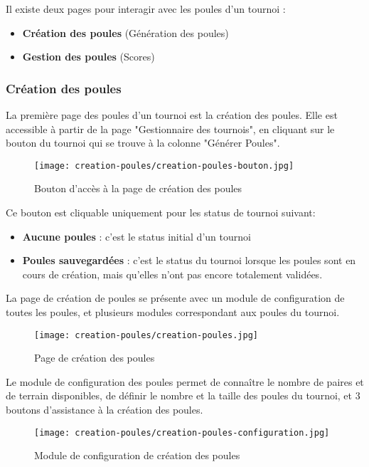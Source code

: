 Il existe deux pages pour interagir avec les poules d'un tournoi :

\begin{itemize}
\item \textbf{Création des poules} (Génération des poules)
\item \textbf{Gestion des poules} (Scores)
\end{itemize}

\subsubsection{Création des poules}

La première page des poules d'un tournoi est la création des poules. Elle est accessible à partir de la page "Gestionnaire des tournois", en cliquant sur le bouton du tournoi qui se trouve à la colonne "Générer Poules".

\begin{figure}[H]
\centering
\texttt{[image: creation-poules/creation-poules-bouton.jpg]}
\caption{Bouton d'accès à la page de création des poules}
\end{figure}

Ce bouton est cliquable uniquement pour les status de tournoi suivant:

\begin{itemize}
\item \textbf{Aucune poules} : c'est le status initial d'un tournoi
\item \textbf{Poules sauvegardées} : c'est le status du tournoi lorsque les poules sont en cours de création, mais qu'elles n'ont pas encore totalement validées.
\end{itemize}
\bigskip

La page de création de poules se présente avec un module de configuration de toutes les poules, et plusieurs modules correspondant aux poules du tournoi.

\begin{figure}[H]
\centering
\texttt{[image: creation-poules/creation-poules.jpg]}
\caption{Page de création des poules}
\end{figure}

Le module de configuration des poules permet de connaître le nombre de paires et de terrain disponibles, de définir le nombre et la taille des poules du tournoi, et 3 boutons d'assistance à la création des poules.

\begin{figure}[H]
\centering
\texttt{[image: creation-poules/creation-poules-configuration.jpg]}
\caption{Module de configuration de création des poules}
\end{figure}

